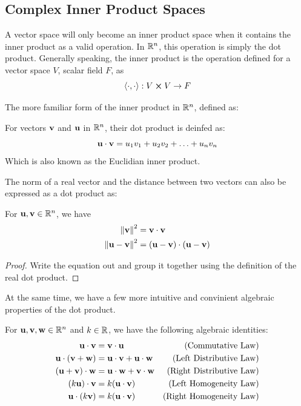 \documentclass[12pt]{article}
\begin{document}
\subsection{Complex Inner Product Spaces}

A vector space will only become an inner product space when it contains the inner product as a valid operation. In $\mathbb{R}^n$, this operation is simply the dot product. Generally speaking, the inner product is the operation defined for a vector space $V$, scalar field $F$, as $$\left\langle \cdot, \cdot \right\rangle: V \cross V \rightarrow F $$

The more familiar form of the inner product in $\mathbb{R}^n$, defined as:

\begin{definition}
    For vectors $\mathbf{v}$ and $\mathbf{u}$ in $\mathbb{R}^n$, their dot product is deinfed as:
    $$\mathbf{u} \cdot \mathbf{v} = u_1 v_1 + u_2 v_2 + \ldots + u_n v_n$$
    Which is also known as the Euclidian inner product.
\end{definition}


The norm of a real vector and the distance between two vectors can also be expressed as a dot product as:

\begin{theorem}
    For $\mathbf{u}, \mathbf{v} \in \mathbb{R}^n$, we have
    \begin{align*}
        \norm{\mathbf{v}}^2 &= \mathbf{v} \cdot \mathbf{v} \\
        \norm{\mathbf{u} - \mathbf{v}}^2 &= (\mathbf{u} - \mathbf{v}) \cdot (\mathbf{u} - \mathbf{v})
    \end{align*}
\end{theorem}

\begin{proof}
    Write the equation out and group it together using the definition of the real dot product. 
\end{proof}

At the same time, we have a few more intuitive and convinient algebraic properties of the dot product. 

\begin{theorem}
    For $\mathbf{u}, \mathbf{v}, \mathbf{w} \in \mathbb{R}^n$ and $k \in \mathbb{R}$, we have the following algebraic identities:
    \begin{align*}
        \mathbf{u} \cdot \mathbf{v} &= \mathbf{v} \cdot \mathbf{u} &\text{(Commutative Law)} \\
        \mathbf{u} \cdot (\mathbf{v} + \mathbf{w}) &= \mathbf{u} \cdot \mathbf{v} + \mathbf{u} \cdot \mathbf{w} &\text{(Left Distributive Law)} \\
        (\mathbf{u} + \mathbf{v}) \cdot \mathbf{w} &= \mathbf{u} \cdot \mathbf{w} + \mathbf{v} \cdot \mathbf{w} &\text{(Right Distributive Law)} \\
        (k \mathbf{u}) \cdot \mathbf{v} &= k(\mathbf{u} \cdot \mathbf{v}) &\text{(Left Homogeneity Law)} \\
        \mathbf{u} \cdot (k \mathbf{v}) &= k(\mathbf{u} \cdot \mathbf{v}) &\text{(Right Homogeneity Law)}
    \end{align*}
\end{theorem}
\end{document}
